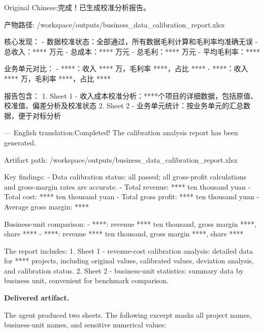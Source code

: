 \documentclass{llmxive}
\providecommand{\caseheader}[1]{\noindent\colorbox{fbcaseblue}{\parbox{0.96\linewidth}{\bfseries #1}}\vspace{0.5mm}\newline}
\begin{document}
\begin{casebox}\scriptsize
\begin{caselines}
Original Chinese:\nopagebreak[4]
完成！已生成校准分析报告。

产物路径: /workspace/outputs/business\_data\_calibration\_report.xlsx

核心发现：
- 数据校准状态：全部通过，所有数据毛利计算和毛利率均准确无误
- 总收入：**** 万元
- 总成本：**** 万元
- 总毛利：**** 万元
- 平均毛利率：****

业务单元对比：
- ****：收入 **** 万，毛利率 ****，占比 ****
- ****：收入 **** 万，毛利率 ****，占比 ****

报告包含：
1. Sheet 1 - 收入成本校准分析：****个项目的详细数据，包括原值、校准值、偏差分析及校准状态
2. Sheet 2 - 业务单元统计：按业务单元的汇总数据，便于对标分析

---
English translation:\nopagebreak[4]
Completed! The calibration analysis report has been generated.

Artifact path: /workspace/outputs/business\_data\_calibration\_report.xlsx

Key findings:
- Data calibration status: all passed; all gross-profit calculations and gross-margin rates are accurate.
- Total revenue: **** ten thousand yuan
- Total cost: **** ten thousand yuan
- Total gross profit: **** ten thousand yuan
- Average gross margin: ****

Business-unit comparison:
- ****: revenue **** ten thousand, gross margin ****, share ****
- ****: revenue **** ten thousand, gross margin ****, share ****

The report includes:
1. Sheet 1 - revenue-cost calibration analysis: detailed data for **** projects, including original values, calibrated values, deviation analysis, and calibration status.
2. Sheet 2 - business-unit statistics: summary data by business unit, convenient for benchmark comparison.
\end{caselines}
\end{casebox}

\caseheader{Delivered artifact.}
The agent produced two sheets. The following excerpt masks all project names, business-unit names, and sensitive numerical values:
\end{document}
